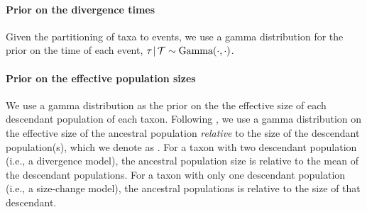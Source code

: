 \paragraph{Prior on the divergence times}
Given the partitioning of taxa to events, we use a gamma
distribution for the prior on the time of each event,
$\tau_{} \,|\, \mathcal{T} \sim \textrm{Gamma}(\cdot, \cdot)$.

\paragraph{Prior on the effective population sizes}
We use a gamma distribution as the prior on the 
the effective size of each descendant population of each taxon.
Following \citet{Oaks2018ecoevolity},
we use a gamma distribution on the effective size of the ancestral population
\emph{relative} to the size of the descendant population(s), which we
denote as \rootrelativepopsize.
For a taxon with two descendant population (i.e., a divergence model), the
ancestral population size is relative to the mean of the descendant
populations.
For a taxon with only one descendant population (i.e., a size-change model),
the ancestral populations is relative to the size of that descendant.

